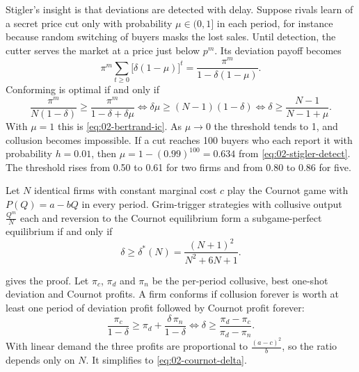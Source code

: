 \begin{example}\label{ex:02-detection-lag}
Stigler's insight is that deviations are detected with delay. Suppose rivals learn of a secret price cut only with
probability $\mu \in (0, 1]$ in each period, for instance because random switching of buyers masks the lost sales.
Until detection, the cutter serves the market at a price just below $p^m$. Its deviation payoff becomes
\begin{equation*}
\pi^m\sum_{t \ge 0}\bigl[\delta(1 - \mu)\bigr]^t = \frac{\pi^m}{1 - \delta(1 - \mu)} .
\end{equation*}
Conforming is optimal if and only if
\begin{equation*}
\frac{\pi^m}{N(1 - \delta)} \ge \frac{\pi^m}{1 - \delta + \delta\mu}
\iff \delta\mu \ge (N - 1)(1 - \delta)
\iff \delta \ge \frac{N - 1}{N - 1 + \mu} .
\end{equation*}
With $\mu = 1$ this is \eqref{eq:02-bertrand-ic}. As $\mu \to 0$ the threshold tends to 1, and collusion becomes
impossible. If a cut reaches 100 buyers who each report it with probability $h = 0.01$, then
$\mu = 1 - (0.99)^{100} = 0.634$ from \eqref{eq:02-stigler-detect}. The threshold rises from 0.50 to 0.61 for
two firms and from 0.80 to 0.86 for five.
\end{example}

\begin{proposition}\label{prop:02-cournot-collusion}
Let $N$ identical firms with constant marginal cost $c$ play the Cournot game with $P(Q) = a - bQ$ in every period.
Grim-trigger strategies with collusive output $\frac{Q^m}{N}$ each and reversion to the Cournot equilibrium form a
subgame-perfect equilibrium if and only if
\begin{equation}\label{eq:02-cournot-delta}
\delta \ge \delta^*(N) = \frac{(N + 1)^2}{N^2 + 6N + 1} .
\end{equation}
\end{proposition}

 gives the proof. Let $\pi_c$, $\pi_d$ and $\pi_n$ be the per-period collusive, best
one-shot deviation and Cournot profits. A firm conforms if collusion forever is worth at least one period of
deviation profit followed by Cournot profit forever:
\begin{equation*}
\frac{\pi_c}{1 - \delta} \ge \pi_d + \frac{\delta\,\pi_n}{1 - \delta}
\iff \delta \ge \frac{\pi_d - \pi_c}{\pi_d - \pi_n} .
\end{equation*}
With linear demand the three profits are proportional to $\frac{(a - c)^2}{b}$, so the ratio depends only on $N$. It
simplifies to \eqref{eq:02-cournot-delta}.

